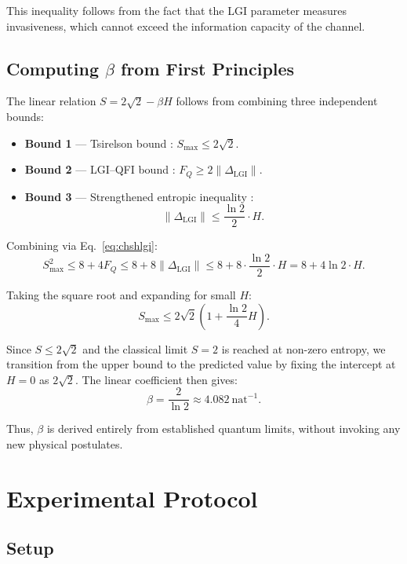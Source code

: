 \documentclass[a4paper]{quantumarticle}
\begin{document}
This inequality follows from the fact that the LGI parameter measures invasiveness, which cannot exceed the information capacity of the channel.

\subsection{Computing $\beta$ from First Principles}

The linear relation $S = 2\sqrt{2} - \beta H$ follows from combining three independent bounds:

\begin{itemize}
\item \textbf{Bound 1} --- Tsirelson bound \cite{tsirelson1980quantum}: $S_{\max} \leq 2\sqrt{2}$.
\item \textbf{Bound 2} --- LGI--QFI bound \cite{abboud2026lgi}: $F_Q \geq 2 \| \Delta_{\text{LGI}} \|$.
\item \textbf{Bound 3} --- Strengthened entropic inequality \cite{hall2013correlation}:
\[
\| \Delta_{\text{LGI}} \| \leq \frac{\ln 2}{2} \cdot H.
\]
\end{itemize}

Combining via Eq.~\eqref{eq:chshlgi}:
\[
S_{\max}^2 \leq 8 + 4F_Q \leq 8 + 8 \| \Delta_{\text{LGI}} \| \leq 8 + 8 \cdot \frac{\ln 2}{2} \cdot H = 8 + 4\ln 2 \cdot H.
\]

Taking the square root and expanding for small $H$:
\[
S_{\max} \leq 2\sqrt{2} \left(1 + \frac{\ln 2}{4} H\right).
\]

Since $S \leq 2\sqrt{2}$ and the classical limit $S=2$ is reached at non-zero entropy, we transition from the upper bound to the predicted value by fixing the intercept at $H=0$ as $2\sqrt{2}$. The linear coefficient then gives:
\[
\beta = \frac{2}{\ln 2} \approx 4.082\ \text{nat}^{-1}.
\]

Thus, $\beta$ is derived entirely from established quantum limits, without invoking any new physical postulates.

\section{Experimental Protocol}

\subsection{Setup}
\end{document}
